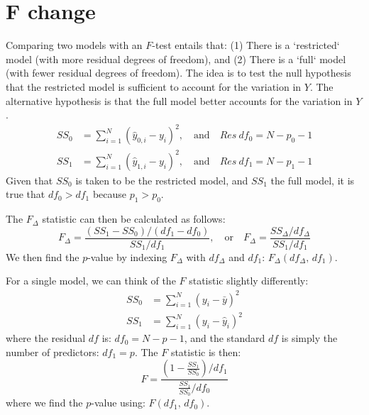 \chapter{F change}
\label{app:J}
Comparing two models with an $F$-test entails that: (1) There is a `restricted` model (with more residual degrees of freedom), and (2) There is a `full` model (with fewer residual degrees of freedom). The idea is to test the null hypothesis that the restricted model is sufficient to account for the variation in $Y$. The alternative hypothesis is that the full model better accounts for the variation in $Y$. 
\begin{equation}
    \begin{split}
        SS_{0} &= \sum_{i=1}^N (\hat{y}_{0,i} - y_i)^2, \quad\text{and}\quad Res\ df_0 = N - p_0 - 1 \\
        SS_{1} &= \sum_{i=1}^N (\hat{y}_{1,i} - y_i)^2, \quad\text{and}\quad Res\ df_1 = N - p_1 - 1
    \end{split}
\end{equation}
Given that $SS_0$ is taken to be the restricted model, and $SS_1$ the full model, it is true that $df_0 > df_1$ because $p_1 > p_0$.

The $F_{\Delta}$ statistic can then be calculated as follows:
\begin{equation}
    F_{\Delta} = \frac{(SS_1 - SS_0)/(df_1 - df_0)}{SS_1/df_1}, \quad\text{or}\quad F_{\Delta} = \frac{SS_{\Delta}/df_{\Delta}}{SS_1/df_1}
\end{equation}
We then find the $p$-value by indexing $F_{\Delta}$ with $df_{\Delta}$ and $df_1$: $F_{\Delta}(df_{\Delta},\,df_1)$.

For a single model, we can think of the $F$ statistic slightly differently:
\begin{equation}
    \begin{split}
        SS_0 &= \sum_{i=1}^N (y_i - \bar{y})^2 \\
        SS_1 &= \sum_{i=1}^N (y_i - \hat{y}_i)^2
    \end{split}
\end{equation}
where the residual $df$ is: $df_0 = N - p - 1$, and the standard $df$ is simply the number of predictors: $df_1 = p$. The $F$ statistic is then:
\begin{equation}
    F = \frac{(1 - \frac{SS_1}{SS_0})/df_1}{\frac{SS_1}{SS_0}/df_0}
\end{equation}
where we find the $p$-value using: $F(df_1,\,df_0)$.

